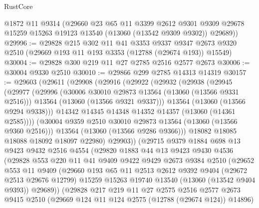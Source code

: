 \begin{lexlean}{RustCore}
\begin{coremodule}
      @1872
      @11
      @9314
      (@29660
        @23
        @65
        @11
        @3399
        @2612
        @9301
        @9309
        @29678
        @15259
        @15263
        @19123
        @13540
        (@13060 (@13542 @9309 @9302))
        @29689))
@29996 := @29828
    @215
    @302
    @11
    @41
    @3353
    @9337
    @9347
    @2673
    @9320
    @2510
    (@29669 @193 @11 @193 @3353 (@12788 (@29674 @193)) @15549)
@30004 := @29828 @300 @219 @11 @27 @2785 @2516 @2577 @2673
@30006 := @30004 @9330 @2510
@30010 := @29866 @299 @2785 @14313 @14319
@30157 := @29603
    (@29611
      (@29908
        (@29916
          (@29922
            (@29932
              (@29938
                (@29945
                  (@29977
                    (@29996
                      (@30006 @30010 @29873 @13564 (@13060 (@13566 @9331 @2516)))
                      @13564
                      (@13060 (@13566 @9321 @9337)))
                    @13564
                    (@13060 (@13566 @9294 @9338)))
                  @14342
                  @14345
                  @14348
                  @14352
                  @14357
                  (@13060 (@14361 @2585))))
              (@30004 @9359 @2510 @30010 @29873 @13564 (@13060 (@13566 @9360 @2516)))
              @13564
              (@13060 (@13566 @9286 @9366)))
            @18082
            @18085
            @18088
            @18092
            @18097
            @22980)
          @29903))
      (@29715
        @9379
        @1884
        @698
        @13
        @9423
        @9432
        @2516
        @4554
        (@29820
          @1883
          @44
          @13
          @9423
          @9430
          @4536
          (@29828
            @553
            @220
            @11
            @41
            @9409
            @9422
            @9429
            @2673
            @9384
            @2510
            (@29652
              @553
              @11
              @9409
              (@29660
                @193
                @65
                @11
                @2513
                @2612
                @9392
                @9404
                (@29672 @2513 @29676 @12799)
                @15259
                @15263
                @19740
                @13540
                (@13060 (@13542 @9404 @9393))
                @29689))
            (@29828
              @217
              @219
              @11
              @27
              @2575
              @2516
              @2577
              @2673
              @9415
              @2510
              (@29669 @124 @11 @124 @2575 (@12788 (@29674 @124)) @14896)

\end{coremodule}
\end{lexlean}
